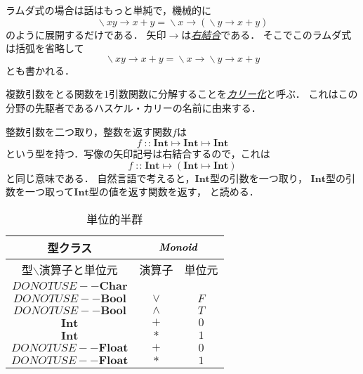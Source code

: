 \documentclass[a5paper,draft]{jsbook}
\newcommand{\keyword}[1]{{\underline{\emph{#1}}}}
\newcommand{\mathTypeParameter}[1]{\mathbf{#1}}
\newcommand{\mathTypeName}[1]{\mathbf{#1}}
\newcommand{\mathTypeClass}[1]{\textbf{\emph{#1}}} %
\newcommand{\mathUnaryOperator}[1]{\operatorname{#1}}
\newcommand{\mathLambda}{\mathUnaryOperator{\backslash}}
\newcommand{\mathBinaryOperator}[1]{\operatorname{#1}}
\newcommand{\mathIn}{\mathBinaryOperator{:\!:}}
\newcommand{\mathLambdaArrow}{\rightarrow}
\newcommand{\mathMapsTo}{\mapsto}
\newcommand{\mathLambdaExpression}[2]{\mathLambda#1\mathLambdaArrow#2}
\newcommand{\mathMorphII}[3]{#1\mathMapsTo#2\mathMapsTo#3}
\newcommand{\mathMorphIIWithParenthesis}[3]{#1\mathMapsTo(#2\mathMapsTo#3)}
\newcommand{\hsklBool}{{DO NOT USE}--\mathTypeParameter{Bool}}
\newcommand{\hsklChar}{{DO NOT USE}--\mathTypeParameter{Char}}
\newcommand{\hsklFloat}{{DO NOT USE}--\mathTypeParameter{Float}}
\begin{document}
ラムダ式の場合は話はもっと単純で，機械的に
\begin{equation}
\mathLambdaExpression{xy}{x+y}
=\mathLambdaExpression{x}{\left(\mathLambdaExpression{y}{x+y}\right)}
\end{equation}
のように展開するだけである．
矢印$\mathLambdaArrow$は\keyword{右結合}である．
そこでこのラムダ式は括弧を省略して
\begin{equation}
\mathLambdaExpression{xy}{x+y}=\mathLambdaExpression{x}{\mathLambdaExpression{y}{x+y}}
\end{equation}
とも書かれる．

複数引数をとる関数を1引数関数に分解することを\keyword{カリー化}と呼ぶ．
これはこの分野の先駆者であるハスケル・カリーの名前に由来する．


整数引数を二つ取り，整数を返す関数$f$は
\begin{equation}
f\mathIn\mathMorphII{\mathTypeName{Int}}{\mathTypeName{Int}}{\mathTypeName{Int}}
\end{equation}
という型を持つ．写像の矢印記号は右結合するので，これは
\begin{equation}
f\mathIn\mathMorphIIWithParenthesis{\mathTypeName{Int}}{\mathTypeName{Int}}{\mathTypeName{Int}}
\end{equation}
と同じ意味である．
自然言語で考えると，$\mathTypeName{Int}$型の引数を一つ取り，
$\mathTypeName{Int}$型の引数を一つ取って$\mathTypeName{Int}$型の値を返す関数を返す，
と読める．

\begin{table}
\caption{単位的半群}
\label{tab:monoids}
\begin{center}
\begin{tabular}{||c||c|c||}
\hline
型クラス
    &\multicolumn{2}{|c||}{$\mathTypeClass{Monoid}$}\\
\hline\hline
型$\backslash$演算子と単位元
    &演算子
    &単位元\\
\hline
$\hsklChar$
    &
    &\\
\hline
$\hsklBool$
    &$\vee$
    &$F$\\
\hline
$\hsklBool$
    &$\wedge$
    &$T$\\
\hline
$\mathTypeName{Int}$
    &$+$
    &$0$\\
\hline
$\mathTypeName{Int}$
    &$*$
    &$1$\\
\hline
$\hsklFloat$
    &$+$
    &$0$\\
\hline
$\hsklFloat$
    &$*$
    &$1$\\
\hline
\end{tabular}
\end{center}
\end{table}
\end{document}
